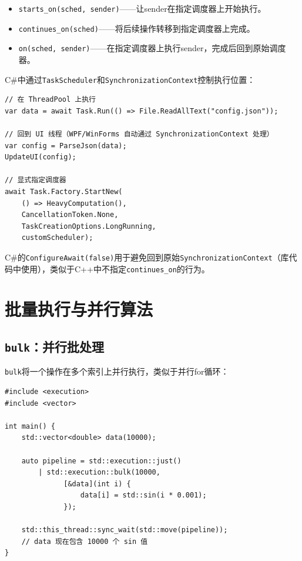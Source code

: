 \documentclass[12pt,a4paper,fontset=fandol]{ctexbook}
\newcommand{\cpp}[1]{C++#1}
\newcommand{\csharp}{C\#}
\begin{document}
\begin{itemize}[nosep]
\item \texttt{starts\_on(sched, sender)}——让sender在指定调度器上开始执行。
\item \texttt{continues\_on(sched)}——将后续操作转移到指定调度器上完成。
\item \texttt{on(sched, sender)}——在指定调度器上执行sender，完成后回到原始调度器。
\end{itemize}

\begin{compare}
\csharp{}中通过\texttt{TaskScheduler}和\texttt{SynchronizationContext}控制执行位置：

\begin{lstlisting}[style=csharpstyle]
// 在 ThreadPool 上执行
var data = await Task.Run(() => File.ReadAllText("config.json"));

// 回到 UI 线程（WPF/WinForms 自动通过 SynchronizationContext 处理）
var config = ParseJson(data);
UpdateUI(config);

// 显式指定调度器
await Task.Factory.StartNew(
    () => HeavyComputation(),
    CancellationToken.None,
    TaskCreationOptions.LongRunning,
    customScheduler);
\end{lstlisting}

\csharp{}的\texttt{ConfigureAwait(false)}用于避免回到原始\texttt{SynchronizationContext}（库代码中使用），类似于\cpp{}中不指定\texttt{continues\_on}的行为。
\end{compare}

\chapter{批量执行与并行算法}

\section{\texttt{bulk}：并行批处理}

\texttt{bulk}将一个操作在多个索引上并行执行，类似于并行for循环：

\begin{lstlisting}
#include <execution>
#include <vector>

int main() {
    std::vector<double> data(10000);

    auto pipeline = std::execution::just()
        | std::execution::bulk(10000,
              [&data](int i) {
                  data[i] = std::sin(i * 0.001);
              });

    std::this_thread::sync_wait(std::move(pipeline));
    // data 现在包含 10000 个 sin 值
}
\end{lstlisting}
\end{document}
